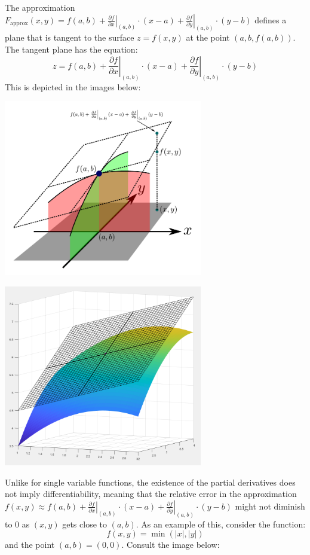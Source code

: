 \documentclass{article}
\begin{document}
The approximation \(F_{\text{approx}}(x, y) = f(a, b) + \left.\frac{\partial f}{\partial x}\right|_{(a,b)} \cdot (x - a) + \left.\frac{\partial f}{\partial y}\right|_{(a,b)} \cdot (y - b)\) defines a plane that is tangent to the surface \(z = f(x, y)\) at the point \((a, b, f(a, b))\). The tangent plane has the equation: 
\[z = f(a, b) + \left.\frac{\partial f}{\partial x}\right|_{(a,b)} \cdot (x - a) + \left.\frac{\partial f}{\partial y}\right|_{(a,b)} \cdot (y - b)\] 
This is depicted in the images below:
\begin{center}
\includegraphics[width = 0.65\textwidth]{differentiability_and_tangent_planes}

\includegraphics[width = 0.65\textwidth]{differentiability_and_tangent_planes_Matlab.png}
\end{center}

\vspace{5mm}

Unlike for single variable functions, the existence of the partial derivatives does not imply differentiability, meaning that the relative error in the approximation \(f(x, y) \approx f(a, b) + \left.\frac{\partial f}{\partial x}\right|_{(a, b)} \cdot (x - a) + \left.\frac{\partial f}{\partial y}\right|_{(a,b)} \cdot (y - b)\)
 might not diminish to \(0\) as \((x, y)\) gets close to \((a, b)\). As an example of this, consider the function: 
\[f(x,y) = \min(|x|, |y|)\]
and the point \((a, b) = (0, 0)\). Consult the image below: 
\end{document}
